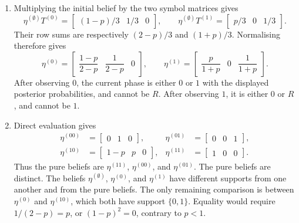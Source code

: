 \begin{solution}[ex:p3-2]
    \begin{enumerate}
      \item Multiplying the initial belief by the two symbol matrices gives
        \[
          \eta^{(\emptyset)}T^{(0)}
            =\begin{bmatrix}(1-p)/3&1/3&0\end{bmatrix},
          \qquad
          \eta^{(\emptyset)}T^{(1)}
            =\begin{bmatrix}p/3&0&1/3\end{bmatrix}.
        \]
        Their row sums are respectively $(2-p)/3$ and $(1+p)/3$.
        Normalising therefore gives
        \[
          \eta^{(0)}
            =\begin{bmatrix}\dfrac{1-p}{2-p}&\dfrac1{2-p}&0\end{bmatrix},
          \qquad
          \eta^{(1)}
            =\begin{bmatrix}\dfrac p{1+p}&0&\dfrac1{1+p}\end{bmatrix}.
        \]
        After observing $0$, the current phase is either $0$ or $1$ with the
        displayed posterior probabilities, and cannot be $R$. After observing
        $1$, it is either $0$ or $R$, and cannot be $1$.

      \item Direct evaluation gives
        \[
          \begin{aligned}
            \eta^{(00)}&=\begin{bmatrix}0&1&0\end{bmatrix},&
            \eta^{(01)}&=\begin{bmatrix}0&0&1\end{bmatrix},\\
            \eta^{(10)}&=\begin{bmatrix}1-p&p&0\end{bmatrix},&
            \eta^{(11)}&=\begin{bmatrix}1&0&0\end{bmatrix}.
          \end{aligned}
        \]
        Thus the pure beliefs are $\eta^{(11)}$, $\eta^{(00)}$, and
        $\eta^{(01)}$.
        The pure beliefs are distinct. The beliefs
        $\eta^{(\emptyset)}$, $\eta^{(0)}$, and $\eta^{(1)}$ have different
        supports from one another and from the pure beliefs. The only remaining
        comparison is between $\eta^{(0)}$ and $\eta^{(10)}$, which both have
        support $\{0,1\}$. Equality would require
        $1/(2-p)=p$, or $(1-p)^2=0$, contrary to $p<1$.


\end{enumerate}
\end{solution}
